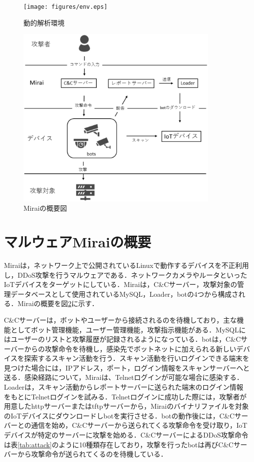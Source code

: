 \newpage

\begin{figure}[h]
   \centering
      \texttt{[image: figures/env.eps]}
      \caption{動的解析環境}
   \label{fig:env}   
\end{figure}

\begin{figure}[h]
   \centering
      \includegraphics[width=100mm]{figures/s.eps}
      \caption{Miraiの概要図}
   \label{fig:Mirai_system}   
\end{figure}

 

\section{マルウェアMiraiの概要}

Miraiは，ネットワーク上で公開されているLinuxで動作するデバイスを不正利用し，DDoS攻撃を行うマルウェアである．ネットワークカメラやルータといったIoTデバイスをターゲットにしている．Miraiは，C\&Cサーバー，攻撃対象の管理データベースとして使用されているMySQL，Loader，botの4つから構成される．Miraiの概要を図\ref{fig:Mirai_system}に示す．


C\&Cサーバーは，ボットやユーザーから接続されるのを待機しており，主な機能としてボット管理機能，ユーザー管理機能，攻撃指示機能がある．MySQLにはユーザーのリストと攻撃履歴が記録されるようになっている．botは，C\&Cサーバーからの攻撃命令を待機し，感染先でボットネットに加えられる新しいデバイスを探索するスキャン活動を行う．スキャン活動を行いログインできる端末を見つけた場合には，IPアドレス，ポート，ログイン情報をスキャンサーバーへと送る．感染経路について，Miraiは、Telnetログインが可能な場合に感染する．Loaderは，スキャン活動からレポートサーバーに送られた端末のログイン情報をもとにTelnetログインを試みる．Telnetログインに成功した際には，攻撃者が用意したhttpサーバーまたはtftpサーバーから，Miraiのバイナリファイルを対象のIoTデバイスにダウンロードしbotを実行させる．botの動作後には，C\&Cサーバーとの通信を始め，C\&Cサーバーから送られてくる攻撃命令を受け取り，IoTデバイスが特定のサーバーに攻撃を始める．C\&CサーバーによるDDoS攻撃命令は表\ref{tab:attack}のように10種類存在しており，攻撃を行ったbotは再びC\&Cサーバーから攻撃命令が送られてくるのを待機している．

